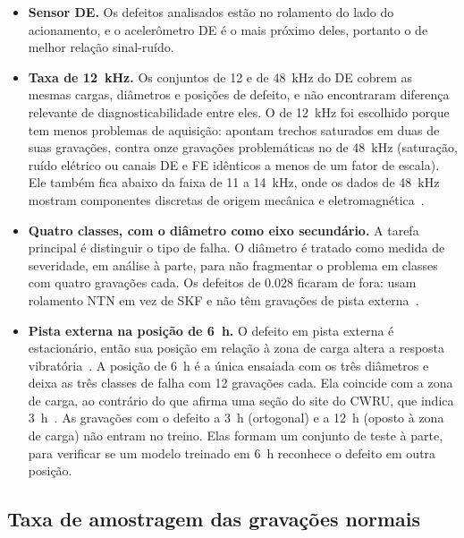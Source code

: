 \begin{itemize}
  \item \textbf{Sensor DE.} Os defeitos analisados estão no rolamento do lado do   acionamento, e o acelerômetro DE é o mais próximo deles, portanto o de melhor relação sinal-ruído.
  \item \textbf{Taxa de \SI{12}{\kilo\hertz}.} Os conjuntos de 12 e de \SI{48}{\kilo\hertz} do DE cobrem as mesmas cargas, diâmetros e posições de defeito, e \textcite{smith2015} não encontraram diferença relevante de diagnosticabilidade entre eles. O de \SI{12}{\kilo\hertz} foi escolhido porque tem menos problemas de aquisição: \textcite{smith2015} apontam trechos saturados em duas de suas gravações, contra onze gravações problemáticas no de \SI{48}{\kilo\hertz} (saturação, ruído elétrico ou canais DE e FE idênticos a
  menos de um fator de escala). Ele também fica abaixo da faixa de 11 a \SI{14}{\kilo\hertz}, onde os dados de \SI{48}{\kilo\hertz} mostram componentes discretas de origem mecânica e eletromagnética~\cite{smith2015}.
  \item \textbf{Quatro classes, com o diâmetro como eixo secundário.} A tarefa principal é distinguir o tipo de falha. O diâmetro é tratado como medida de severidade, em análise à parte, para não fragmentar o problema em classes com quatro gravações cada. Os defeitos de \SI{0.028}{\inch} ficaram de fora: usam rolamento NTN em vez de SKF e não têm gravações de pista externa~\cite{cwru,smith2015}.
  \item \textbf{Pista externa na posição de 6~h.} O defeito em pista externa é estacionário, então sua posição em relação à zona de carga altera a resposta vibratória~\cite{cwru}. A posição de 6~h é a única ensaiada com os três
  diâmetros e deixa as três classes de falha com 12 gravações cada. Ela coincide com a zona de carga, ao contrário do que afirma uma seção do site do CWRU, que indica 3~h~\cite{smith2015}. As gravações com o defeito a 3~h (ortogonal) e a 12~h (oposto à zona de carga) não entram no treino. Elas formam um conjunto de teste à parte, para verificar se um modelo treinado em 6~h reconhece o defeito em outra posição.
\end{itemize}

\subsection{Taxa de amostragem das gravações normais}
\label{sec:fs-normais}

